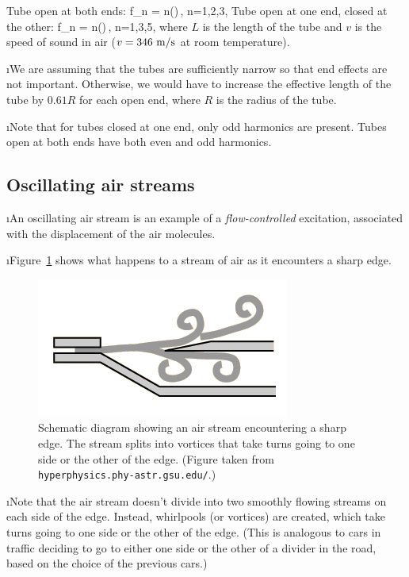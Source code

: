 Tube open at both ends:
%
\be
f_n = n\left(\right)\,,
\qquad
n=1,2,3,\cdots
\label{e:open}
\ee
%
Tube open at one end, closed at the other:
%
\be
f_n = n\left(\right)\,,
\qquad
n=1,3,5,\cdots
\label{e:closed}
\ee
%
where $L$ is the length of the tube and 
$v$ is the speed of sound in air 
($v=346~{\rm m/s}$ at room temperature).

\i We are assuming that the tubes are sufficiently
narrow so that end effects are not important.
Otherwise, we would have to increase the effective 
length of the tube by $0.61 R$ for each open end,
where $R$ is the radius of the tube.

\i Note that for tubes closed at one end,
only odd harmonics are present.
Tubes open at both ends have both even and odd 
harmonics.

\ei
\subsection{Oscillating air streams}
\bi

\i An oscillating air stream is an example of 
a {\em flow-controlled} excitation, associated 
with the displacement of the air molecules.

\i Figure~\ref{f:edge} shows what happens 
to a stream of air as it encounters a sharp
edge.
%
\begin{figure}[htbp]
\begin{center}
\includegraphics[width=.5\textwidth]{edge.jpg}
\caption{Schematic diagram showing an air 
stream encountering a sharp edge.
The stream splits into vortices that take 
turns going to one side or the other of the edge.
(Figure taken from 
{\tt hyperphysics.phy-astr.gsu.edu/}.)}
\label{f:edge}
\end{center}
\end{figure}

\i Note that the air stream doesn't divide 
into two smoothly flowing streams on each 
side of the edge.
Instead, whirlpools (or vortices) are created,
which take turns going to one side or the 
other of the edge.
(This is analogous to cars in traffic deciding
to go to either one side or the other of 
a divider in the road, based on the choice of
the previous cars.)

